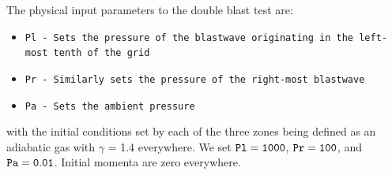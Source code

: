 The physical input parameters to the double blast test are:
\begin{itemize}
\item \tt{Pl} - Sets the pressure of the blastwave originating in the left-most tenth of the grid
\item \tt{Pr} - Similarly sets the pressure of the right-most blastwave
\item \tt{Pa} - Sets the ambient pressure
\end{itemize}


with the initial conditions set by each of the three zones being defined as an adiabatic gas with $\gamma$ = 1.4 everywhere. 
We set $\tt{Pl} = 1000$, $\tt{Pr} = 100$, and $\tt{Pa} = 0.01$. Initial momenta are zero everywhere.
